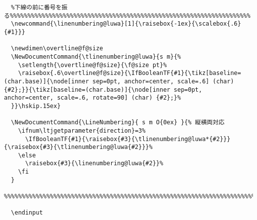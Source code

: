 \documentclass[luatex,fontsize=8pt,paper=b5,twoside]{jlreq}%
\begin{document}
\begin{lstlisting}
  %下線の前に番号を振る%%%%%%%%%%%%%%%%%%%%%%%%%%%%%%%%%%%%%%%%%%%%%%%%%%%%%%%%%%%%%%%%%%%%
  \newcommand{\linenumbering@luwa}[1]{\raisebox{-1ex}{\scalebox{.6}{#1}}}

  \newdimen\overtline@f@size
  \NewDocumentCommand{\tlinenumbering@luwa}{s m}{%
    \setlength{\overtline@f@size}{\f@size pt}%
    \raisebox{.6\overtline@f@size}{\IfBooleanTF{#1}{\tikz[baseline=(char.base)]{\node[inner sep=0pt, anchor=center, scale=.6] (char) {#2};}}{\tikz[baseline=(char.base)]{\node[inner sep=0pt, anchor=center, scale=.6, rotate=90] (char) {#2};}%
  }}\hskip.15ex}

  \NewDocumentCommand{\LineNumbering}{ s m O{0ex} }{% 縦横両対応
    \ifnum\ltjgetparameter{direction}=3%
      \IfBooleanTF{#1}{\raisebox{#3}{\tlinenumbering@luwa*{#2}}}{\raisebox{#3}{\tlinenumbering@luwa{#2}}}%
    \else
      \raisebox{#3}{\linenumbering@luwa{#2}}%
    \fi
  }
  %%%%%%%%%%%%%%%%%%%%%%%%%%%%%%%%%%%%%%%%%%%%%%%%%%%%%%%%%%%%%%%%%%%%%%%%%%%%%%%%%%%%%%%%%

  \endinput
\end{lstlisting}
\end{document}
